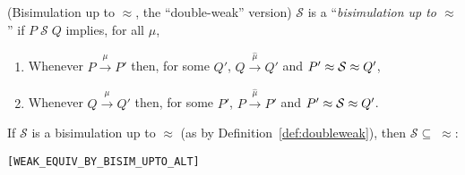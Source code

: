 \begin{definition}{(Bisimulation up to $\approx$, the ``double-weak''
    version)}
  \label{def:doubleweak}
$\mathcal{S}$ is a ``\emph{bisimulation up to $\approx$}'' if $P \;
  \mathcal{S} \; Q$ implies, for all $\mu$,
\begin{enumerate}
\item Whenever $P \overset{\mu}{\rightarrow} P'$ then, for some
  $Q'$, $Q \overset{\hat{\mu}}{\rightarrow} Q'$ and $P' \approx \S \approx Q'$,
\item Whenever $Q \overset{\mu}{\rightarrow} Q'$ then, for some
  $P'$, $P \overset{\hat{\mu}}{\rightarrow} P'$ and $P' \approx \S \approx Q'$.
\end{enumerate}
\end{definition}

\begin{theorem}
If $\mathcal{S}$ is a bisimulation up to $\approx$ (as by Definition~\ref{def:doubleweak}), then
$\mathcal{S} \subseteq\;\approx$:
\begin{alltt}
\HOLTokenTurnstile{}   \HOLSymConst{\HOLTokenConj{}}    \HOLSymConst{\HOLTokenImp{}}  \HOLSymConst{\HOLTokenWeakEQ} \hfill{[WEAK_EQUIV_BY_BISIM_UPTO_ALT]}
\end{alltt}
\end{theorem}

